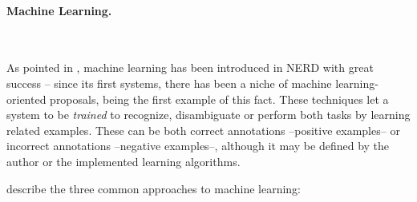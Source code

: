 \paragraph{Machine Learning.}~

As pointed in \cite{rizzo2011nerd}, machine learning has been introduced in NERD with great success -- since its first systems, there has been a niche of machine learning-oriented proposals, being \cite{milne2008} the first example of this fact. These techniques let a system to be \emph{trained} to recognize, disambiguate or perform both tasks by learning related examples. These can be both correct annotations --positive examples-- or incorrect annotations --negative examples--, although it may be defined by the author or the implemented learning algorithms.

\cite{nadeau2007survey} describe the three common approaches to machine learning:

\smallskip

